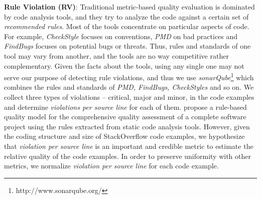 \documentclass[conference]{IEEEtran}
\begin{document}
\textbf{Rule Violation (RV)}: Traditional metric-based quality evaluation is dominated by code analysis tools, and they try to analyze the code against a certain set of \emph{ recommended rules}. Most of the tools concentrate on  particular aspects of code. For example, \emph{CheckStyle} focuses on conventions, \emph{PMD} on bad practices and \emph{FindBugs} focuses on potential bugs or threats. Thus, rules and standards of one tool may vary from another, and the tools are no way competitive rather complementary. Given the facts about the tools, using any single one may not serve our purpose of detecting rule violations, and thus we use \emph{sonarQube}\footnote{http://www.sonarqube.org/} which combines the rules and standards of \emph{PMD, FindBugs, CheckStyles} and so on. We collect three types of violations -- critical, major and minor, in the code examples and determine \emph{violations per source line} for each of them. \citet{lochmann} propose a rule-based quality model for the comprehensive quality assessment of a complete software project using the rules extracted from static code analysis tools. However, given the coding structure and size of StackOverflow code examples, we hypothesize that \emph{violation per source line} is an important and credible metric to estimate the relative quality of the code examples. In order to preserve uniformity with other metrics, we normalize \emph{violation per source line} for each code example.
\vspace{-.1cm}
\end{document}
